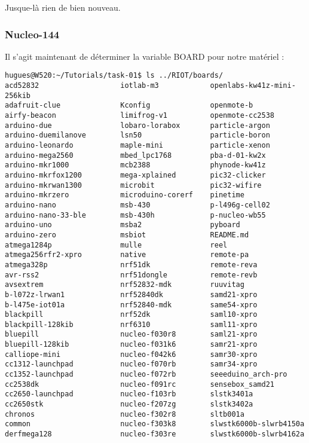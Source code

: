 Jusque-là rien de bien nouveau.

\subsubsection{Nucleo-144}

Il s'agit maintenant de déterminer la variable BOARD
pour notre matériel :
{\footnotesize
\begin{verbatim}
hugues@W520:~/Tutorials/task-01$ ls ../RIOT/boards/
acd52832                   iotlab-m3            openlabs-kw41z-mini-256kib
adafruit-clue              Kconfig              openmote-b
airfy-beacon               limifrog-v1          openmote-cc2538
arduino-due                lobaro-lorabox       particle-argon
arduino-duemilanove        lsn50                particle-boron
arduino-leonardo           maple-mini           particle-xenon
arduino-mega2560           mbed_lpc1768         pba-d-01-kw2x
arduino-mkr1000            mcb2388              phynode-kw41z
arduino-mkrfox1200         mega-xplained        pic32-clicker
arduino-mkrwan1300         microbit             pic32-wifire
arduino-mkrzero            microduino-corerf    pinetime
arduino-nano               msb-430              p-l496g-cell02
arduino-nano-33-ble        msb-430h             p-nucleo-wb55
arduino-uno                msba2                pyboard
arduino-zero               msbiot               README.md
atmega1284p                mulle                reel
atmega256rfr2-xpro         native               remote-pa
atmega328p                 nrf51dk              remote-reva
avr-rss2                   nrf51dongle          remote-revb
avsextrem                  nrf52832-mdk         ruuvitag
b-l072z-lrwan1             nrf52840dk           samd21-xpro
b-l475e-iot01a             nrf52840-mdk         same54-xpro
blackpill                  nrf52dk              saml10-xpro
blackpill-128kib           nrf6310              saml11-xpro
bluepill                   nucleo-f030r8        saml21-xpro
bluepill-128kib            nucleo-f031k6        samr21-xpro
calliope-mini              nucleo-f042k6        samr30-xpro
cc1312-launchpad           nucleo-f070rb        samr34-xpro
cc1352-launchpad           nucleo-f072rb        seeeduino_arch-pro
cc2538dk                   nucleo-f091rc        sensebox_samd21
cc2650-launchpad           nucleo-f103rb        slstk3401a
cc2650stk                  nucleo-f207zg        slstk3402a
chronos                    nucleo-f302r8        sltb001a
common                     nucleo-f303k8        slwstk6000b-slwrb4150a
derfmega128                nucleo-f303re        slwstk6000b-slwrb4162a

\end{verbatim}}
